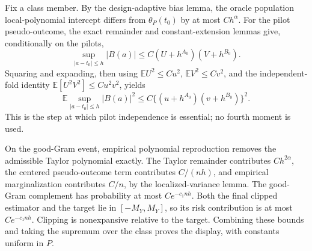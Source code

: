 Fix a class member. By the design-adaptive bias lemma, the oracle population local-polynomial intercept differs from \(\theta_P(t_0)\) by at most \(Ch^\alpha\). For the pilot pseudo-outcome, the exact remainder and constant-extension lemmas give, conditionally on the pilots,
\[
\sup_{\lvert a-t_0\rvert\le h}\lvert B(a)\rvert
\le C(U+h^{A_0})(V+h^{B_0}).
\]
Squaring and expanding, then using \(\mathbb EU^2\le Cu^2\), \(\mathbb EV^2\le Cv^2\), and the independent-fold identity \(\mathbb E[U^2V^2]\le Cu^2v^2\), yields
\[
\mathbb E\sup_{\lvert a-t_0\rvert\le h}\lvert B(a)\rvert^2
\le C\{(u+h^{A_0})(v+h^{B_0})\}^2.
\]
This is the step at which pilot independence is essential; no fourth moment is used.

On the good-Gram event, empirical polynomial reproduction removes the admissible Taylor polynomial exactly. The Taylor remainder contributes \(Ch^{2\alpha}\), the centered pseudo-outcome term contributes \(C/(nh)\), and empirical marginalization contributes \(C/n\), by the localized-variance lemma. The good-Gram complement has probability at most \(Ce^{-c_1nh}\). Both the final clipped estimator and the target lie in \([-M_Y,M_Y]\), so its risk contribution is at most \(Ce^{-c_1nh}\). Clipping is nonexpansive relative to the target. Combining these bounds and taking the supremum over the class proves the display, with constants uniform in \(P\).